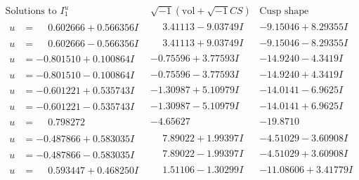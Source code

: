 \documentclass[1p]{elsarticle_modified}
\theoremstyle{definition}
\newcommand{\I}{\sqrt{-1}}
\begin{document}
$$\begin{array}{c|c|c}  
\text{Solutions to }I^u_{1}& \I (\text{vol} + \sqrt{-1}CS) & \text{Cusp shape}\\
 \hline 
\begin{aligned}
u &= \phantom{-}0.602666 + 0.566356 I\end{aligned}
 & \phantom{-}3.41113 - 9.03749 I & -9.15046 + 8.29355 I \\ \hline\begin{aligned}
u &= \phantom{-}0.602666 - 0.566356 I\end{aligned}
 & \phantom{-}3.41113 + 9.03749 I & -9.15046 - 8.29355 I \\ \hline\begin{aligned}
u &= -0.801510 + 0.100864 I\end{aligned}
 & -0.75596 + 3.77593 I & -14.9240 - 4.3419 I \\ \hline\begin{aligned}
u &= -0.801510 - 0.100864 I\end{aligned}
 & -0.75596 - 3.77593 I & -14.9240 + 4.3419 I \\ \hline\begin{aligned}
u &= -0.601221 + 0.535743 I\end{aligned}
 & -1.30987 + 5.10979 I & -14.0141 - 6.9625 I \\ \hline\begin{aligned}
u &= -0.601221 - 0.535743 I\end{aligned}
 & -1.30987 - 5.10979 I & -14.0141 + 6.9625 I \\ \hline\begin{aligned}
u &= \phantom{-}0.798272\phantom{ +0.000000I}\end{aligned}
 & -4.65627\phantom{ +0.000000I} & -19.8710\phantom{ +0.000000I} \\ \hline\begin{aligned}
u &= -0.487866 + 0.583035 I\end{aligned}
 & \phantom{-}7.89022 + 1.99397 I & -4.51029 - 3.60908 I \\ \hline\begin{aligned}
u &= -0.487866 - 0.583035 I\end{aligned}
 & \phantom{-}7.89022 - 1.99397 I & -4.51029 + 3.60908 I \\ \hline\begin{aligned}
u &= \phantom{-}0.593447 + 0.468250 I\end{aligned}
 & \phantom{-}1.51106 - 1.30299 I & -11.08606 + 3.41779 I \\ \hline\begin{aligned}

\end{aligned}
\end{array}$$
\end{document}
